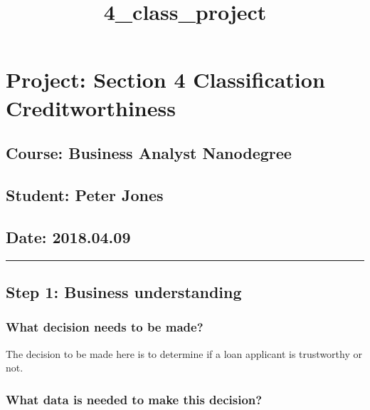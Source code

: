 \documentclass[11pt]{article}
\title{4\_class\_project}
\begin{document}
    
    
    \maketitle
    
    

    
    \section{Project: Section 4 \textbar{} Classification \textbar{}
Creditworthiness}\label{project-section-4-classification-creditworthiness}

    \subsection{Course: Business Analyst
Nanodegree}\label{course-business-analyst-nanodegree}

\subsection{Student: Peter Jones}\label{student-peter-jones}

\subsection{Date: 2018.04.09}\label{date-2018.04.09}

    \begin{center}\rule{0.5\linewidth}{\linethickness}\end{center}

    \subsection{Step 1: Business
understanding}\label{step-1-business-understanding}

    \subsubsection{What decision needs to be
made?}\label{what-decision-needs-to-be-made}

The decision to be made here is to determine if a loan applicant is
trustworthy or not.

    \subsubsection{What data is needed to make this
decision?}\label{what-data-is-needed-to-make-this-decision}
\end{document}
